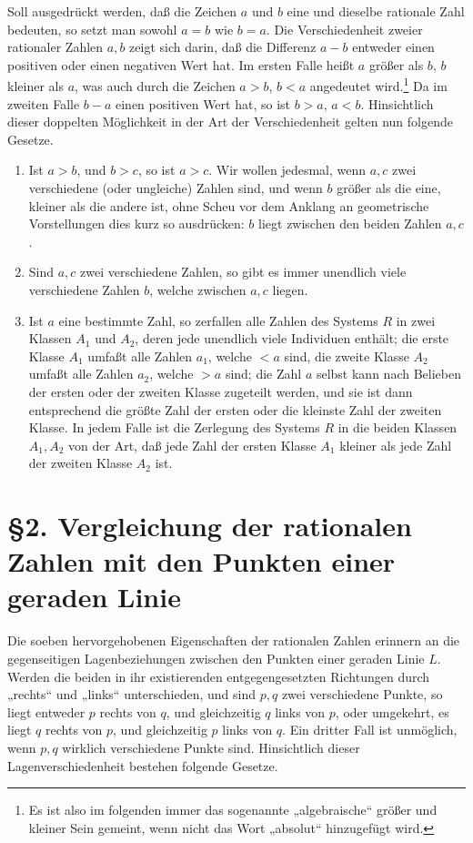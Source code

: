 \documentclass[11pt]{article}
\begin{document}
Soll ausgedrückt werden, daß die Zeichen $a$ und $b$ eine und dieselbe rationale Zahl bedeuten, so setzt man sowohl $a=b$ wie $b=a$. Die Verschiedenheit zweier rationaler Zahlen $a,b$ zeigt sich darin, daß die Differenz $a-b$ entweder einen positiven oder einen negativen Wert hat. Im ersten Falle heißt $a$ größer als $b$, $b$ kleiner als $a$, was auch durch die Zeichen $a>b$, $b<a$ angedeutet wird.\footnote{Es ist also im folgenden immer das sogenannte „algebraische“ größer und kleiner Sein gemeint, wenn nicht das Wort „absolut“ hinzugefügt wird.} Da im zweiten Falle $b-a$ einen positiven Wert hat, so ist $b>a$, $a<b$. Hinsichtlich dieser doppelten Möglichkeit in der Art der Verschiedenheit gelten nun folgende Gesetze.

\begin{enumerate}[label=\Roman*.]
\item Ist $a>b$, und $b>c$, so ist $a>c$. Wir wollen jedesmal, wenn $a,c$ zwei verschiedene (oder ungleiche) Zahlen sind, und wenn $b$ größer als die eine, kleiner als die andere ist, ohne Scheu vor dem Anklang an geometrische Vorstellungen dies kurz so ausdrücken: $b$ liegt zwischen den beiden Zahlen $a,c$.
\item Sind $a,c$ zwei verschiedene Zahlen, so gibt es immer unendlich viele verschiedene Zahlen $b$, welche zwischen $a,c$ liegen.
\item Ist $a$ eine bestimmte Zahl, so zerfallen alle Zahlen des Systems $R$ in zwei Klassen $A_1$ und $A_2$, deren jede unendlich viele Individuen enthält; die erste Klasse $A_1$ umfaßt alle Zahlen $a_1$, welche $<a$ sind, die zweite Klasse $A_2$ umfaßt alle Zahlen $a_2$, welche $>a$ sind; die Zahl $a$ selbst kann nach Belieben der ersten oder der zweiten Klasse zugeteilt werden, und sie ist dann entsprechend die größte Zahl der ersten oder die kleinste Zahl der zweiten Klasse. In jedem Falle ist die Zerlegung des Systems $R$ in die beiden Klassen $A_1,A_2$ von der Art, daß jede Zahl der ersten Klasse $A_1$ kleiner als jede Zahl der zweiten Klasse $A_2$ ist.
\end{enumerate}

\section*{\S 2. Vergleichung der rationalen Zahlen mit den Punkten einer geraden Linie}

Die soeben hervorgehobenen Eigenschaften der rationalen Zahlen erinnern an die gegenseitigen Lagenbeziehungen zwischen den Punkten einer geraden Linie $L$. Werden die beiden in ihr existierenden entgegengesetzten Richtungen durch „rechts“ und „links“ unterschieden, und sind $p,q$ zwei verschiedene Punkte, so liegt entweder $p$ rechts von $q$, und gleichzeitig $q$ links von $p$, oder umgekehrt, es liegt $q$ rechts von $p$, und gleichzeitig $p$ links von $q$. Ein dritter Fall ist unmöglich, wenn $p,q$ wirklich verschiedene Punkte sind. Hinsichtlich dieser Lagenverschiedenheit bestehen folgende Gesetze.
\end{document}
